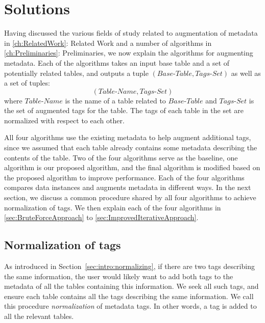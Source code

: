 
\chapter{Solutions}
\label{ch:Solutions}

Having discussed the various fields of study related to augmentation of metadata in \autoref{ch:RelatedWork}: Related Work and a number of algorithms in \autoref{ch:Preliminaries}: Preliminaries, we now explain the algorithms for augmenting metadata. Each of the algorithms takes an input base table and a set of potentially related tables, and outputs a tuple $(\textit{Base-Table}, \textit{Tags-Set})$ as well as a set of tuples:
\[
(\textit{Table-Name}, \textit{Tags-Set})
\]
where $\textit{Table-Name}$ is the name of a table related to $\textit{Base-Table}$ and $\textit{Tags-Set}$ is the set of augmented tags for the table. The tags of each table in the set are normalized with respect to each other.


All four algorithms use the existing metadata to help augment additional tags, since we assumed that each table already contains some metadata describing the contents of the table. Two of the four algorithms serve as the baseline, one algorithm is our proposed algorithm, and the final algorithm is modified based on the proposed algorithm to improve performance. Each of the four algorithms compares data instances and augments metadata in different ways. In the next section, we discuss a common procedure shared by all four algorithms to achieve normalization of tags. We then explain each of the four algorithms in \autoref{sec:BruteForceApproach} to \autoref{sec:ImprovedIterativeApproach}.

\section{Normalization of tags}
\label{sec:CommonProcedureForNormalizationOfTags}

As introduced in Section~\ref{sec:intro:normalizing}, if there are two tags describing the same information, the user 
would likely want to add both tags to the metadata of all the tables containing this information. We seek all such tags, and ensure each table contains all the tags describing
the same information. We call this procedure \textit{normalization} of metadata tags. In
other words, a tag is added to all the relevant tables.


